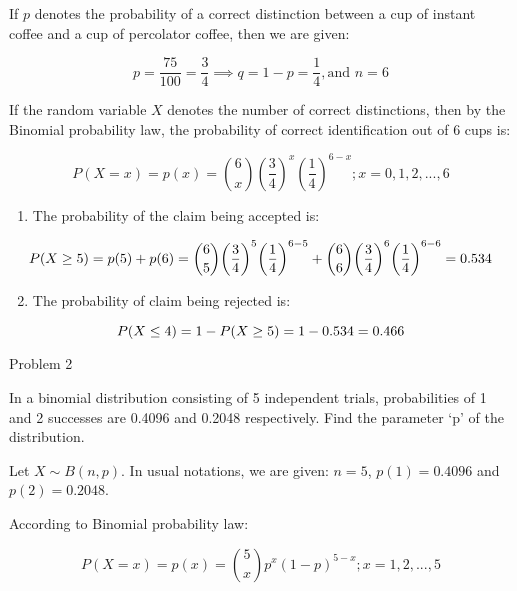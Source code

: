\documentclass[ignorenonframetext,aspectratio=169]{beamer}
\providecommand{\tightlist}{%
  \setlength{\itemsep}{0pt}\setlength{\parskip}{0pt}}
\begin{document}
\begin{frame}{}
\protect\hypertarget{section-22}{}

If \(p\) denotes the probability of a correct distinction between a cup
of instant coffee and a cup of percolator coffee, then we are given:

\[
p = \frac{75}{100} = \frac{3}{4} \implies q = 1-p = \frac{1}{4}, \text{and } n = 6
\]

If the random variable \(X\) denotes the number of correct distinctions,
then by the Binomial probability law, the probability of correct
identification out of 6 cups is:

\[
P(X = x) = p(x) = \binom{6}{x} {\left(\frac{3}{4}\right)}^x {\left(\frac{1}{4}\right)}^{6-x};  x = 0, 1, 2, ..., 6
\]

\end{frame}

\begin{frame}{}
\protect\hypertarget{section-23}{}

\begin{enumerate}
\tightlist
\item
  The probability of the claim being accepted is:
\end{enumerate}

\[
\small
P(X \geq 5) = p(5) + p(6) = \binom{6}{5} {\left(\frac{3}{4}\right)}^5 {\left(\frac{1}{4}\right)}^{6-5} 
+ 
\binom{6}{6} {\left(\frac{3}{4}\right)}^6 {\left(\frac{1}{4}\right)}^{6-6}
= 0.534
\]

\begin{enumerate}
\setcounter{enumi}{1}
\tightlist
\item
  The probability of claim being rejected is:
\end{enumerate}

\[
\small
P(X \leq 4) = 1 - P (X \geq 5) = 1-0.534 = 0.466
\]

\end{frame}

\begin{frame}{Problem 2}
\protect\hypertarget{problem-2-2}{}

In a binomial distribution consisting of 5 independent trials,
probabilities of 1 and 2 successes are 0.4096 and 0.2048 respectively.
Find the parameter `p' of the distribution.

\end{frame}

\begin{frame}{}
\protect\hypertarget{section-24}{}

Let \(X \sim B(n, p)\). In usual notations, we are given: \(n = 5\),
\(p(1) = 0.4096\) and \(p(2) = 0.2048\).

According to Binomial probability law:

\[
P(X = x) = p(x) = \binom{5}{x}p^x (1-p)^{5-x}; x = 1, 2, ..., 5
\]

\end{frame}
\end{document}
